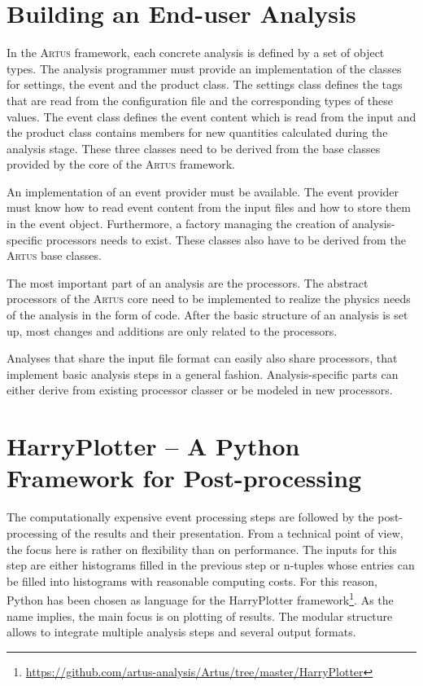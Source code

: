 \documentclass[3p]{elsarticle}
\newcommand{\software}[1]{\textsc{#1}\xspace}
\newcommand{\artus}{\software{Artus}}
\begin{document}
\section{Building an End-user Analysis}
\label{section_artus_analysis}
In the \artus framework, each concrete analysis is defined by a set of object types.
The analysis programmer must provide an implementation of the classes for settings, the event and the product class.
The settings class defines the tags that are read from the configuration file and the corresponding types of these values.
The event class defines the event content which is read from the input and the product class contains members for new quantities calculated during the analysis stage.
These three classes need to be derived from the base classes provided by the core of the \artus framework.

An implementation of an event provider must be available.
The event provider must know how to read event content from the input files and how to store them in the event object.
Furthermore, a factory managing the creation of analysis-specific processors needs to exist.
These classes also have to be derived from the \artus base classes.

The most important part of an analysis are the processors.
The abstract processors of the \artus core need to be implemented to realize the physics needs of the analysis in the form of code.
After the basic structure of an analysis is set up, most changes and additions are only related to the processors.

Analyses that share the input file format can easily also share processors, that implement basic analysis steps in a general fashion.
Analysis-specific parts can either derive from existing processor classer or be modeled in new processors.


\section{HarryPlotter -- A Python Framework for Post-processing}
\label{section_artus_harryplotter}

The computationally expensive event processing steps are followed by the post-processing of the results and their presentation.
From a technical point of view, the focus here is rather on flexibility than on performance.
The inputs for this step are either histograms filled in the previous step or n-tuples whose entries can be filled into histograms with reasonable computing costs.
For this reason, Python has been chosen as language for the HarryPlotter framework\footnote{\url{https://github.com/artus-analysis/Artus/tree/master/HarryPlotter}}.
As the name implies, the main focus is on plotting of results.
The modular structure allows to integrate multiple analysis steps and several output formats.
\end{document}
